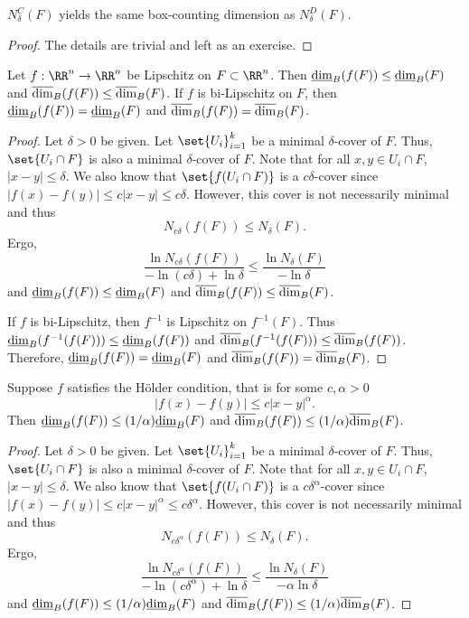 \begin{thm}
	$N^C_\delta(F)$ yields the same box-counting dimension as $N^D_\delta(F)$.
\end{thm}
\begin{proof}
	The details are trivial and left as an exercise.
\end{proof}

\begin{thm}
	Let $f:\RR^n\rightarrow\RR^n$ be Lipschitz on $F\subset\RR^n$.
	Then $\underline{\operatorname{dim}}_B(f(F))\leq\underline{\operatorname{dim}}_B(F)$ and $\overline{\operatorname{dim}}_B(f(F))\leq\overline{\operatorname{dim}}_B(F)$.
	If $f$ is bi-Lipschitz on $F$, then $\underline{\operatorname{dim}}_B(f(F))=\underline{\operatorname{dim}}_B(F)$ and $\overline{\operatorname{dim}}_B(f(F))=\overline{\operatorname{dim}}_B(F)$.
\end{thm}
\begin{proof}
	Let $\delta > 0$ be given.
	Let $\set{U_i}_{i=1}^k$ be a minimal $\delta$-cover of $F$.
	Thus, $\set{U_i\cap F}$ is also a minimal $\delta$-cover of $F$.
	Note that for all $x,y\in U_i\cap F$, $|x-y|\leq \delta$.
	We also know that $\set{f(U_i\cap F)}$ is a $c\delta$-cover since $|f(x)-f(y)|\leq c|x-y|\leq c\delta$.
	However, this cover is not necessarily minimal and thus
	\[
		N_{c\delta}(f(F))\leq N_\delta(F).
	\]
	Ergo,
	\[
		\frac{\ln N_{c\delta}(f(F))}{-\ln(c\delta)+\ln\delta}\leq\frac{\ln N_\delta(F)}{-\ln\delta}
	\]
	and $\underline{\operatorname{dim}}_B(f(F))\leq\underline{\operatorname{dim}}_B(F)$ and $\overline{\operatorname{dim}}_B(f(F))\leq\overline{\operatorname{dim}}_B(F)$.
	
	If $f$ is bi-Lipschitz, then $f^{-1}$ is Lipschitz on $f^{-1}(F)$.
	Thus $\underline{\operatorname{dim}}_B(f^{-1}(f(F)))\leq\underline{\operatorname{dim}}_B(f(F))$ and $\overline{\operatorname{dim}}_B(f^{-1}(f(F)))\leq\overline{\operatorname{dim}}_B(f(F))$.
	Therefore, $\underline{\operatorname{dim}}_B(f(F))=\underline{\operatorname{dim}}_B(F)$ and $\overline{\operatorname{dim}}_B(f(F))=\overline{\operatorname{dim}}_B(F)$.
\end{proof}

\begin{thm}
	Suppose $f$ satisfies the H\"{o}lder condition, that is for some $c,\alpha>0$
	\[
		|f(x)-f(y)|\leq c|x-y|^\alpha.
	\]
	Then $\underline{\operatorname{dim}}_B(f(F))\leq(1/\alpha)\underline{\operatorname{dim}}_B(F)$ and $\overline{\operatorname{dim}}_B(f(F))\leq(1/\alpha)\overline{\operatorname{dim}}_B(F)$.
\end{thm}
\begin{proof}
	Let $\delta > 0$ be given.
	Let $\set{U_i}_{i=1}^k$ be a minimal $\delta$-cover of $F$.
	Thus, $\set{U_i\cap F}$ is also a minimal $\delta$-cover of $F$.
	Note that for all $x,y\in U_i\cap F$, $|x-y|\leq \delta$.
	We also know that $\set{f(U_i\cap F)}$ is a $c\delta^\alpha$-cover since $|f(x)-f(y)|\leq c|x-y|^\alpha\leq c\delta^\alpha$.
	However, this cover is not necessarily minimal and thus
	\[
		N_{c\delta^\alpha}(f(F))\leq N_\delta(F).
	\]
	Ergo,
	\[
		\frac{\ln N_{c\delta^\alpha}(f(F))}{-\ln(c\delta^\alpha)+\ln\delta}\leq\frac{\ln N_\delta(F)}{-\alpha\ln\delta}
	\]
	and $\underline{\operatorname{dim}}_B(f(F))\leq(1/\alpha)\underline{\operatorname{dim}}_B(F)$ and $\overline{\operatorname{dim}}_B(f(F))\leq(1/\alpha)\overline{\operatorname{dim}}_B(F)$.
\end{proof}

